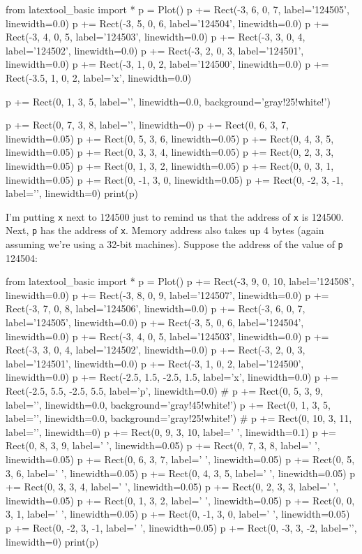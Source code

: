\begin{python}
from latextool_basic import *
p = Plot()
p += Rect(-3, 6, 0, 7, label='124505', linewidth=0.0)
p += Rect(-3, 5, 0, 6, label='124504', linewidth=0.0)
p += Rect(-3, 4, 0, 5, label='124503', linewidth=0.0)
p += Rect(-3, 3, 0, 4, label='124502', linewidth=0.0)
p += Rect(-3, 2, 0, 3, label='124501', linewidth=0.0)
p += Rect(-3, 1, 0, 2, label='124500', linewidth=0.0)
p += Rect(-3.5, 1, 0, 2, label='x', linewidth=0.0)

p += Rect(0, 1, 3, 5, label='', linewidth=0.0, background='gray!25!white!')

p += Rect(0, 7, 3, 8, label='', linewidth=0)
p += Rect(0, 6, 3, 7, linewidth=0.05)
p += Rect(0, 5, 3, 6, linewidth=0.05)
p += Rect(0, 4, 3, 5, linewidth=0.05)
p += Rect(0, 3, 3, 4, linewidth=0.05)
p += Rect(0, 2, 3, 3, linewidth=0.05)
p += Rect(0, 1, 3, 2, linewidth=0.05)
p += Rect(0, 0, 3, 1, linewidth=0.05)
p += Rect(0, -1, 3, 0, linewidth=0.05)
p += Rect(0, -2, 3, -1, label='', linewidth=0)
print(p)
\end{python}


I'm putting \texttt{x} next to 124500 just to remind us that the address of \texttt{x} is 124500. Next, \texttt{p} has the address of \texttt{x}.
Memory address also takes up 4 bytes (again assuming we're using a 32-bit machines). Suppose the address of the value of \texttt{p} 124504:

\begin{python}
from latextool_basic import *
p = Plot()
p += Rect(-3, 9, 0, 10, label='124508', linewidth=0.0)
p += Rect(-3, 8, 0, 9, label='124507', linewidth=0.0)
p += Rect(-3, 7, 0, 8, label='124506', linewidth=0.0)
p += Rect(-3, 6, 0, 7, label='124505', linewidth=0.0)
p += Rect(-3, 5, 0, 6, label='124504', linewidth=0.0)
p += Rect(-3, 4, 0, 5, label='124503', linewidth=0.0)
p += Rect(-3, 3, 0, 4, label='124502', linewidth=0.0)
p += Rect(-3, 2, 0, 3, label='124501', linewidth=0.0)
p += Rect(-3, 1, 0, 2, label='124500', linewidth=0.0)
p += Rect(-2.5, 1.5, -2.5, 1.5, label='x', linewidth=0.0)
p += Rect(-2.5, 5.5, -2.5, 5.5, label='p', linewidth=0.0)
#
p += Rect(0, 5, 3, 9, label='', linewidth=0.0, background='gray!45!white!')
p += Rect(0, 1, 3, 5, label='', linewidth=0.0, background='gray!25!white!')
#
p += Rect(0, 10, 3, 11, label='', linewidth=0)
p += Rect(0, 9, 3, 10, label=' ', linewidth=0.1)
p += Rect(0, 8, 3, 9, label=' ', linewidth=0.05)
p += Rect(0, 7, 3, 8, label=' ', linewidth=0.05)
p += Rect(0, 6, 3, 7, label=' ', linewidth=0.05)
p += Rect(0, 5, 3, 6, label=' ', linewidth=0.05)
p += Rect(0, 4, 3, 5, label=' ', linewidth=0.05)
p += Rect(0, 3, 3, 4, label=' ', linewidth=0.05)
p += Rect(0, 2, 3, 3, label=' ', linewidth=0.05)
p += Rect(0, 1, 3, 2, label=' ', linewidth=0.05)
p += Rect(0, 0, 3, 1, label=' ', linewidth=0.05)
p += Rect(0, -1, 3, 0, label=' ', linewidth=0.05)
p += Rect(0, -2, 3, -1, label=' ', linewidth=0.05)
p += Rect(0, -3, 3, -2, label='', linewidth=0)
print(p)
\end{python}

